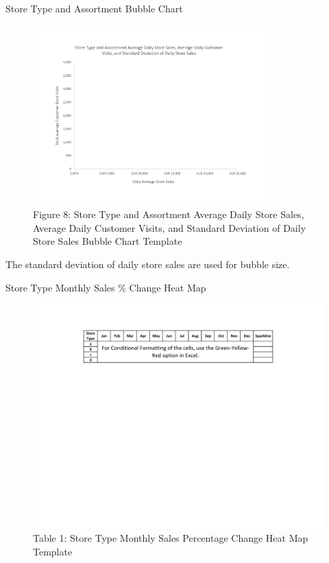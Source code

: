 \documentclass[pdf]{beamer}
\theoremstyle{remark}
\theoremstyle{definition}
\begin{document}
\begin{frame}[t]{Store Type and Assortment Bubble Chart}
\begin{figure}[htbp]
    \centering
    \captionsetup{justification=centering}
    \includegraphics[clip, trim=0cm 2.3cm 0cm 2.3cm, width=0.8\textwidth]{Bubble_Chart_Unit_3_Template.pdf}  
    \caption{Figure {\color{franklinblue} 8}: Store Type and Assortment Average Daily Store Sales, Average Daily Customer Visits, and Standard Deviation of Daily Store Sales Bubble Chart Template}
    \label{fig:bubblechart0}
\end{figure}
\vspace{-2.0ex}
\small
The standard deviation of daily store sales are used for bubble size. 
\end{frame}

\begin{frame}[t]{Store Type Monthly Sales \% Change Heat Map}
\begin{figure}[htbp]
    \centering
    \captionsetup{justification=centering}
    \includegraphics[clip, trim=4.9cm 15.5cm 0cm 2.5cm, width=1.25\textwidth]{Heat_Map_Unit_3_Template.pdf}  
    \caption{Table {\color{franklinblue} 1}: Store Type Monthly Sales Percentage Change Heat Map Template}
    \label{fig:heatmap0}
\end{figure}
\end{frame}
\end{document}
